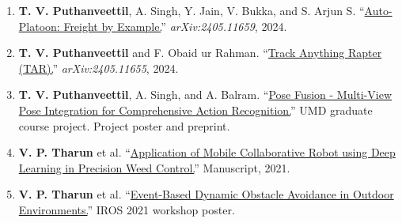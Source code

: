 \begin{enumerate}[leftmargin=18pt,itemsep=2.2pt,topsep=2pt]
\item \textbf{T. V. Puthanveettil}, A. Singh, Y. Jain, V. Bukka, and S. Arjun S. ``\href{https://arxiv.org/abs/2405.11659}{Auto-Platoon: Freight by Example.}'' \textit{arXiv:2405.11659}, 2024.  
\item \textbf{T. V. Puthanveettil} and F. Obaid ur Rahman. ``\href{https://arxiv.org/abs/2405.11655}{Track Anything Rapter (TAR).}'' \textit{arXiv:2405.11655}, 2024.  
\item \textbf{T. V. Puthanveettil}, A. Singh, and A. Balram. ``\href{https://www.researchgate.net/publication/378143241_Pose_Fusion_-_Multi-View_Pose_Integration_for_Comprehensive_Action_Recognition}{Pose Fusion - Multi-View Pose Integration for Comprehensive Action Recognition.}'' UMD graduate course project. Project poster and preprint.  
\item \textbf{V. P. Tharun} et al. ``\href{https://drive.google.com/file/d/1piWRkBv1j-_5-h8RNXS63Tf8b7eT6lat/view?usp=sharing}{Application of Mobile Collaborative Robot using Deep Learning in Precision Weed Control.}'' Manuscript, 2021.
\item \textbf{V. P. Tharun} et al. ``\href{https://www.researchgate.net/publication/378143055_Event_Based_Dynamic_Obstacle_Avoidance_For_Outdoor_Environments}{Event-Based Dynamic Obstacle Avoidance in Outdoor Environments.}'' IROS 2021 workshop poster.
\end{enumerate}
